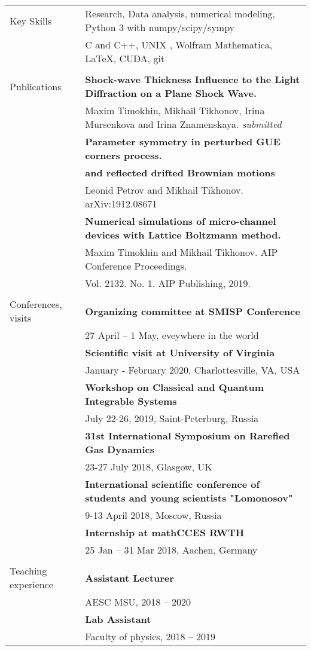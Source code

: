 \documentclass[letterpaper,10pt,oneside,utf8]{article}
\begin{document}
\begin{tabular}{@{} l l}
		
	
	    \Large {Key Skills} & Research, Data analysis, numerical modeling, Python 3 with numpy/scipy/sympy\\
	                        &C and C++, UNIX , Wolfram Mathematica, LaTeX, CUDA, git\\
        &\\
		\Large{Publications}  
		&\textbf{Shock-wave Thickness Influence to the Light Diffraction on a Plane Shock Wave.}\\&
		Maxim Timokhin, Mikhail Tikhonov, Irina Mursenkova and Irina Znamenskaya. \textit{submitted}\\
		&\textbf{Parameter symmetry in perturbed GUE corners process.	}\\&\textbf{and reflected drifted Brownian motions}\\& Leonid Petrov and  Mikhail Tikhonov. arXiv:1912.08671\\
		&\textbf{Numerical simulations of micro-channel devices with Lattice Boltzmann method. }\\
		&Maxim Timokhin  and Mikhail Tikhonov. AIP Conference Proceedings. \\
		&Vol. 2132. No. 1. AIP Publishing, 2019.\\
		&\\
		\Large{Conferences, visits} 
		&\textbf{Organizing committee at SMISP Conference}\\
		& 27 April -- 1 May, eveywhere in the world \\
		&\textbf{Scientific visit at University of Virginia}\\
		& January - February 2020, Charlottesville, VA, USA  \\
		&\textbf{Workshop on Classical and Quantum Integrable Systems}\\
		&July 22-26, 2019, Saint-Peterburg, Russia\\
		& \textbf{31st International Symposium on Rarefied Gas Dynamics}\\
		& 23-27 July 2018, Glasgow, UK\\
		&\textbf{International scientific conference of students and young scientists "Lomonosov"}\\
		& 9-13 April 2018,  Moscow, Russia\\
		&\textbf{Internship at mathCCES RWTH}\\
		& 25 Jan -- 31 Mar 2018, Aachen, Germany \\
        &\\
		\Large{Teaching experience}&
		\textbf{Assistant Lecturer}\\
		&AESC MSU, 2018 -- 2020\\
		&\textbf{Lab Assistant}\\
		&Faculty of physics, 2018 -- 2019\\

		
		
	\end{tabular}
	
\end{document}
